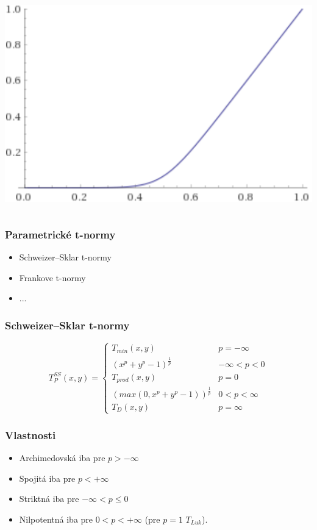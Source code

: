 \documentclass{beamer}
\begin{document}
\begin{frame}
\begin{columns}
\begin{minipage}[c][0.4\textheight][c]{\linewidth}
\end{minipage}
\begin{minipage}[c][0.4\textheight][c]{\linewidth}
  \centering
  \includegraphics[width=0.7\linewidth]{FT/FT30000-diag}
\end{minipage}
\end{columns}
\end{frame}




\begin{frame}
\frametitle{Parametrické t-normy}
\begin{itemize}
\item Schweizer–Sklar t-normy
\item Frankove t-normy
\item ...
\end{itemize}
\end{frame}


\begin{frame}
\frametitle{Schweizer–Sklar t-normy}
\[ T_P^{SS}(x,y)=\begin{cases} 
      T_{min}(x,y) & p = -\infty \\
      (x^p + y^p -1)^{\frac{1}{p}} & -\infty < p < 0 \\
      T_{prod}(x,y) & p = 0 \\
      (max(0,x^p + y^p -1))^{\frac{1}{p}} & 0 < p < \infty \\
      T_D(x,y) & p = \infty 
   \end{cases}
\]
\end{frame}
\begin{frame}
\frametitle{Vlastnosti}
\begin{itemize}
    \item Archimedovská iba pre $p > -\infty$
    \item Spojitá iba pre $p < +\infty$
    \item Striktná iba pre $-\infty < p \leq 0$
    \item Nilpotentná iba pre $0 < p < +\infty$ (pre $p = 1$  $T_{Luk}$).
\end{itemize}
\end{frame}
\end{document}
